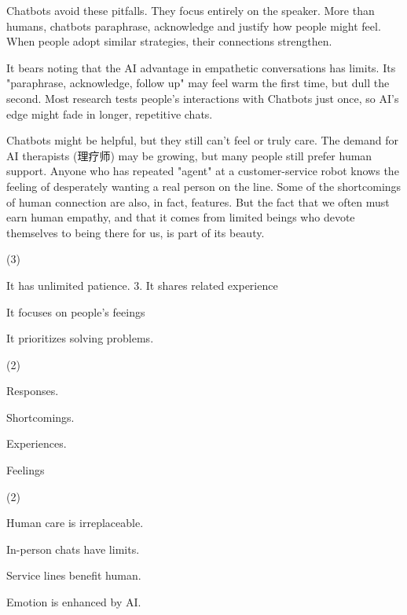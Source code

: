 \documentclass{英语试卷}
\begin{document}
\par Chatbots avoid these pitfalls. They focus entirely on the speaker. More than humans, chatbots paraphrase, acknowledge and justify how people might feel. When people adopt similar strategies, their connections strengthen.\par
\par It bears noting that the AI advantage in empathetic conversations has limits. Its "paraphrase, acknowledge, follow up" may feel warm the first time, but dull the second. Most research tests people's interactions with Chatbots just once, so AI's edge might fade in longer, repetitive chats.\par
\par Chatbots might be helpful, but they still can't feel or truly care. The demand for AI therapists (理疗师) may be growing, but many people still prefer human support. Anyone who has repeated "agent" at a customer-service robot knows the feeling of desperately wanting a real person on the line. Some of the shortcomings of human connection are also, in fact, features. But the fact that we often must earn human empathy, and that it comes from limited beings who devote themselves to being there for us, is part of its beauty.\par
{}
\begin{choices}(3)
  \item It has unlimited patience. 3. It shares related experience
  \item It focuses on people's feeings
  \item It prioritizes solving problems.
\end{choices}
\begin{choices}(2)
  \item Responses.
  \item Shortcomings.
  \item Experiences.
  \item Feelings
\end{choices}
\begin{choices}(2)
  \item Human care is irreplaceable.
  \item In-person chats have limits.
  \item Service lines benefit human.
  \item Emotion is enhanced by AI.
\end{choices}
\end{document}
